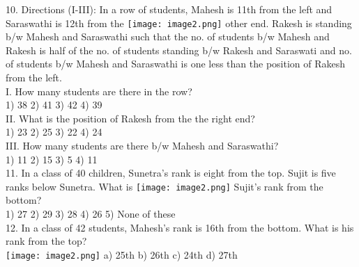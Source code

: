 \documentclass[
]{article}
\begin{document}
10. Directions (I-III): In a row of students, Mahesh is 11th from the left and Saraswathi is 12th from the \texttt{[image: image2.png]}
other end. Rakesh is standing b/w Mahesh and Saraswathi such that the no. of students b/w Mahesh and Rakesh is half of the no. of students standing b/w Rakesh and Saraswati and no. of students b/w Mahesh and Saraswathi is one less than the position of Rakesh from the left.\\

I. How many students are there in the row?\\
1) 38 \hspace{2mm}2) 41 \hspace{2mm}3) 42 \hspace{2mm}4) 39\\

II. What is the position of Rakesh from the the right end?\\
1) 23 \hspace{2mm}2) 25 \hspace{2mm}3) 22 \hspace{2mm}4) 24\\

III. How many students are there b/w Mahesh and Saraswathi?\\
1) 11 \hspace{2mm}2) 15 \hspace{2mm}3) 5 \hspace{2mm}4) 11\\

11. In a class of 40 children, Sunetra’s rank is eight from the top. Sujit is five ranks below Sunetra. What is \texttt{[image: image2.png]}
Sujit’s rank from the bottom?\\
1) 27 \hspace{2mm}2) 29 \hspace{2mm}3) 28 \hspace{2mm}4) 26 \hspace{2mm}5) None of these\\

12. In a class of 42 students, Mahesh’s rank is 16th from the bottom. What is his rank from the top?\\
\texttt{[image: image2.png]}
a) 25th \hspace{2mm}b) 26th \hspace{2mm}c) 24th \hspace{2mm}d) 27th\\
\end{document}
